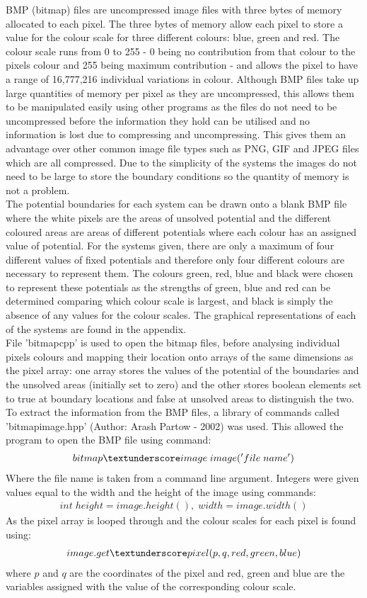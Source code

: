 BMP (bitmap) files are uncompressed image files with three bytes of memory allocated to each pixel. The three bytes of memory allow each pixel to store a value for the colour scale for three different colours: blue, green and red. The colour scale runs from 0 to 255 - 0 being no contribution from that colour to the pixels colour and 255 being maximum contribution - and allows the pixel to have a range of 16,777,216 individual variations in colour. Although BMP files take up large quantities of memory per pixel as they are uncompressed, this allows them to be manipulated easily using other programs as the files do not need to be uncompressed before the information they hold can be utilised and no information is lost due to compressing and uncompressing. This gives them an advantage over other common image file types such as PNG, GIF and JPEG files which are all compressed. Due to the simplicity of the systems the images do not need to be large to store the boundary conditions so the quantity of memory is not a problem. 
\\
The potential boundaries for each system can be drawn onto a blank BMP file where the white pixels are the areas of unsolved potential and the different coloured areas are areas of different potentials where each colour has an assigned value of potential. For the systems given, there are only a maximum of four different values of fixed potentials and therefore only four different colours are necessary to represent them. The colours green, red, blue and black were chosen to represent these potentials as the strengths of green, blue and red can be determined comparing which colour scale is largest, and black is simply the absence of any values for the colour scales. The graphical representations of each of the systems are found in the appendix.
\\
File 'bitmap\textunderscore cpp' is used to open the bitmap files, before analysing individual pixels colours and mapping their location onto arrays of the same dimensions as the pixel array: one array stores the values of the potential of the boundaries and the unsolved areas (initially set to zero) and the other stores boolean elements set to true at boundary locations and false at unsolved areas to distinguish the two. To extract the information from the BMP files, a library of commands called 'bitmap\textunderscore image.hpp' (Author:  Arash Partow - 2002) was used. This allowed the program to open the BMP file using command:
\begin{align}
bitmap\textunderscore image \; image('file \;name')
\end{align}
Where the file name is taken from a command line argument. Integers were given values equal to the width and the height of the image using commands:
\begin{align}
int\; height = image.height(),\; width = image.width()
\end{align}
As the pixel array is looped through and the colour scales for each pixel is found using:
\begin{align}
image.get\textunderscore pixel(p,q,red,green,blue)
\end{align}
where $p$ and $q$ are the coordinates of the pixel and red, green and blue are the variables assigned with the value of the corresponding colour scale.

